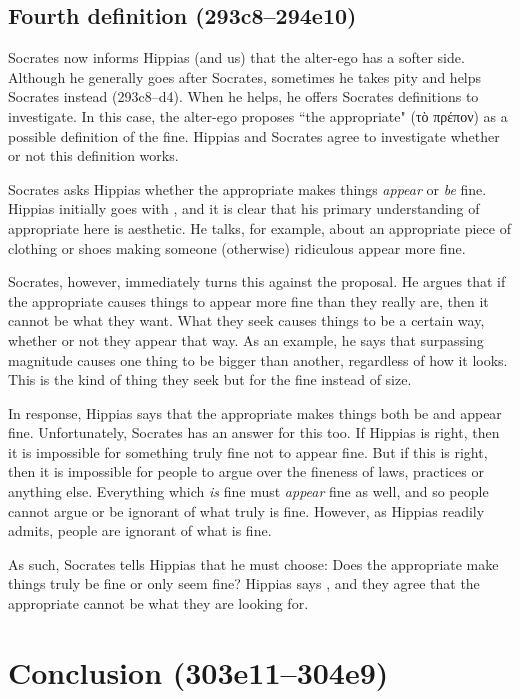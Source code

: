 \documentclass[11pt]{article}
\begin{document}

\subsection{Fourth definition (293c8--294e10)}

Socrates now informs Hippias (and us) that the alter-ego has a softer side.  Although he generally goes after Socrates, sometimes he takes pity and helps Socrates instead (293c8--d4).  When he helps, he offers Socrates definitions to investigate.  In this case, the alter-ego proposes ``the appropriate" (τὸ πρέπον) as a possible definition of the fine. Hippias and Socrates agree to investigate whether or not this definition works.

Socrates asks Hippias whether the appropriate makes things \emph{appear} or \emph{be} fine.  Hippias initially goes with , and it is clear that his primary understanding of appropriate here is aesthetic.  He talks, for example, about an appropriate piece of clothing or shoes making someone (otherwise) ridiculous appear more fine.

Socrates, however, immediately turns this against the proposal.  He argues that if the appropriate causes things to appear more fine than they really are, then it cannot be what they want.  What they seek causes things to be a certain way, whether or not they appear that way.  As an example, he says that surpassing magnitude causes one thing to be bigger than another, regardless of how it looks.  This is the kind of thing they seek but for the fine instead of size.

In response, Hippias says that the appropriate makes things both be and appear fine.  Unfortunately, Socrates has an answer for this too.  If Hippias is right, then it is impossible for something truly fine not to appear fine.  But if this is right, then it is impossible for people to argue over the fineness of laws, practices or anything else.  Everything which \emph{is} fine must \emph{appear} fine as well, and so people cannot argue or be ignorant of what truly is fine.  However, as Hippias readily admits, people are ignorant of what is fine.

As such, Socrates tells Hippias that he must choose: Does the appropriate make things truly be fine or only seem fine?  Hippias says , and they agree that the appropriate cannot be what they are looking for.


\section{Conclusion (303e11--304e9)}




\newpage


\end{document}
